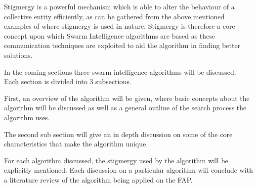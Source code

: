 Stigmergy is a powerful mechanism which is able to alter the behaviour of a collective entity efficiently, as can be gathered from the above mentioned examples of where stigmergy is used in nature. Stigmergy is therefore a core concept upon which Swarm Intelligence algorithms are based as these communication techniques are exploited to aid the algorithm in finding better solutions.

In the coming sections three swarm intelligence algorithms will be discussed. Each section is divided into 3 subsections. 

First, an overview of the algorithm will be given, where basic concepts about the algorithm will be discussed as well as a general outline of the search process the algorithm uses. 

The second sub section will give an in depth discussion on some of the core characteristics that make the algorithm unique. 

For each algorithm discussed, the stigmergy used by the algorithm will be explicitly mentioned. Each discussion on a particular algorithm will conclude with a literature review of the algorithm being applied on the FAP.
